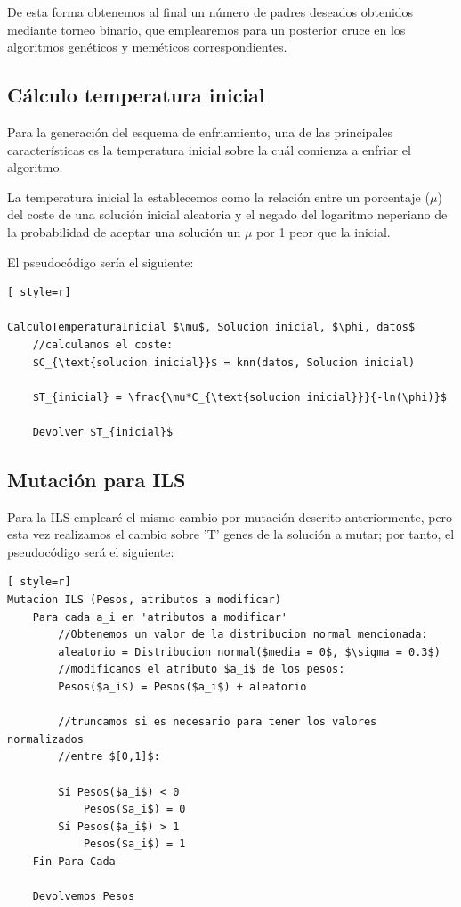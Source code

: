 De esta forma obtenemos al final un número de padres deseados obtenidos mediante torneo binario, que emplearemos para un posterior cruce en los algoritmos genéticos y meméticos correspondientes.


\subsection{Cálculo temperatura inicial}
Para la generación del esquema de enfriamiento, una de las principales características es la temperatura inicial sobre la cuál comienza a enfriar el algoritmo.

La temperatura inicial la establecemos como la relación entre un porcentaje ($\mu$) del coste de una solución inicial aleatoria y el negado del logaritmo neperiano de la probabilidad de aceptar una solución un $\mu$ por 1 peor que la inicial.

El pseudocódigo sería el siguiente:
\begin{lstlisting}[ style=r]

CalculoTemperaturaInicial $\mu$, Solucion inicial, $\phi, datos$
	//calculamos el coste:
	$C_{\text{solucion inicial}}$ = knn(datos, Solucion inicial)
	
	$T_{inicial} = \frac{\mu*C_{\text{solucion inicial}}}{-ln(\phi)}$

	Devolver $T_{inicial}$

\end{lstlisting}

\subsection{Mutación para ILS}
Para la ILS emplearé el mismo cambio por mutación descrito anteriormente, pero esta vez realizamos el cambio sobre 'T' genes de la solución a mutar; por tanto, el pseudocódigo será el siguiente:


\begin{lstlisting}[ style=r]
Mutacion ILS (Pesos, atributos a modificar)
	Para cada a_i en 'atributos a modificar'
		//Obtenemos un valor de la distribucion normal mencionada:
		aleatorio = Distribucion normal($media = 0$, $\sigma = 0.3$)
		//modificamos el atributo $a_i$ de los pesos:
		Pesos($a_i$) = Pesos($a_i$) + aleatorio
		
		//truncamos si es necesario para tener los valores normalizados 
		//entre $[0,1]$:
		
		Si Pesos($a_i$) < 0
			Pesos($a_i$) = 0
		Si Pesos($a_i$) > 1
			Pesos($a_i$) = 1
	Fin Para Cada
		
	Devolvemos Pesos
\end{lstlisting}





